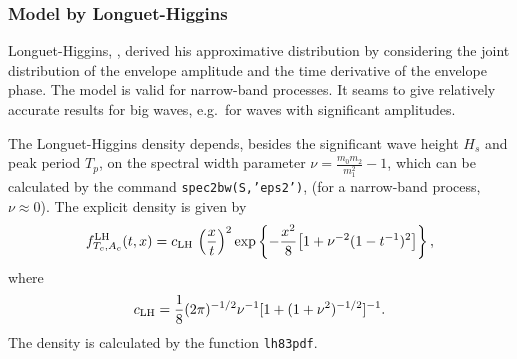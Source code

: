 \subsubsection*{Model by Longuet-Higgins}  %
Longuet-Higgins,
\cite{Longuet-Higgins1975Joint,Longuet-Higgins1983Joint}, derived his
approximative distribution by considering the joint
distribution of the envelope amplitude and the time derivative of the
envelope phase. The model is valid for narrow-band processes.
It seams to give relatively accurate results for big waves, e.g.\
for waves with significant amplitudes.

The Longuet-Higgins density depends, besides
the significant wave height $H_s$ and peak period $T_p$, on
the spectral width parameter
$ \nu = \frac{m_0m_2}{m_1^2}-1$,
which can be calculated by the command {\tt spec2bw(S,'eps2')},
(for a narrow-band process, $\nu \approx 0$). The explicit density is
given by
\[
f^{\mbox{\scriptsize{LH}}}_{T_c,A_c}(t,x)=c_{\mbox{\scriptsize{LH}}}\,
\left(\frac{x}{t}\right)^2 \exp\left\{
    -\frac{x^2}{8}\big[1+\nu^{-2}(1-t^{-1})^2\big] \right\} ,
\]
where
\[
c_{\mbox{\scriptsize{LH}}}=\frac{1}{8}(2\pi)^{-1/2}\nu^{-1}[
  1+(1+\nu^2)^{-1/2}]^{-1}.
\]
The density is calculated by the
function \verb+lh83pdf+. 


